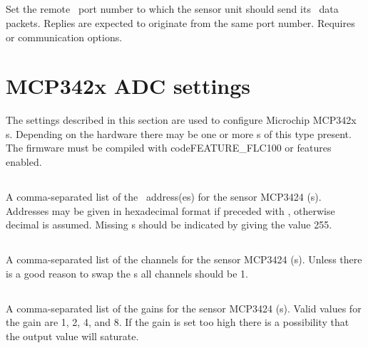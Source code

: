 \subsection[remote-ip-port]{}

Set the remote \ip\ port number to which the sensor unit should send
its \udp\ data packets. Replies are expected to originate from the
same port number.  Requires  or 
communication options.


\section{MCP342x ADC settings}
\label{sec:eeprom-mcp342x-adc}

The settings described in this section are used to configure Microchip
MCP342x \adc s. Depending on the hardware there may be one or more
\adc s of this type present. The firmware must be compiled with
code{FEATURE_FLC100} or  features enabled.

\subsection[adc-address-list]{}

A comma-separated list of the \itwoc\ address(es) for the sensor
MCP3424 \adc(s).  Addresses may be given in hexadecimal format if
preceded with , otherwise decimal is assumed. Missing \adc s
should be indicated by giving the value 255.


\subsection[adc-channel-list]{}

A comma-separated list of the channels for the sensor MCP3424
\adc(s). Unless there is a good reason to swap the \adc s all channels
should be 1.


\subsection[adc-gain-list]{}

A comma-separated list of the gains for the sensor MCP3424
\adc(s). Valid values for the gain are 1, 2, 4, and 8. If the gain is
set too high there is a possibility that the output value will
saturate. %

